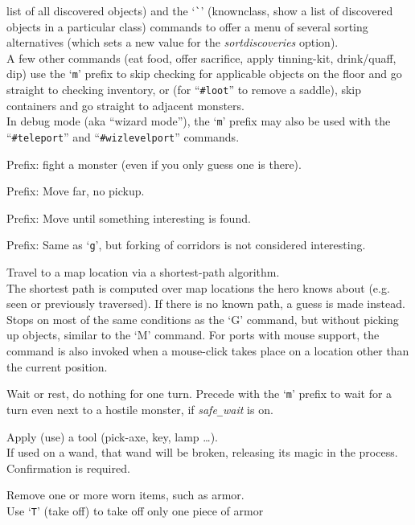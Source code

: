 list of all discovered objects) and the `{\tt \`{}}' (knownclass,
show a list of discovered objects in a particular class) commands to offer
a menu of several sorting alternatives (which sets a new value for the
{\it sortdiscoveries\/} option).
\\
A few other commands (eat food, offer sacrifice, apply tinning-kit,
drink/quaff, dip) use
the `{\tt m}' prefix to skip checking for applicable objects on
the floor and go straight to checking inventory,
or (for ``{\tt \#loot}'' to remove a saddle),
skip containers and go straight to adjacent monsters.
\\
In debug mode (aka ``wizard mode''), the `{\tt m}' prefix may also be
used with the ``{\tt \#teleport}'' and ``{\tt \#wizlevelport}'' commands.
\item[\tb{F[yuhjklbn]}]
Prefix:  fight a monster (even if you only guess one is there).
\item[\tb{M[yuhjklbn]}]
Prefix:  Move far, no pickup.
\item[\tb{g[yuhjklbn]}]
Prefix:  Move until something interesting is found.
\item[\tb{G[yuhjklbn] {\rm or} <CONTROL->[yuhjklbn]}]
Prefix:  Same as `{\tt g}', but forking of corridors is not considered
interesting.
\item[\tb{_}]
Travel to a map location via a shortest-path algorithm.\\
The shortest path
is computed over map locations the hero knows about (e.g. seen or
previously traversed).  If there is no known path, a guess is made instead.
Stops on most of
the same conditions as the `G' command, but without picking up
objects, similar to the `M' command.  For ports with mouse
support, the command is also invoked when a mouse-click takes place on a
location other than the current position.
\item[\tb{.}]
Wait or rest, do nothing for one turn. Precede with the `{\tt m}' prefix
to wait for a turn even next to a hostile monster, if {\it safe\verb+_+wait\/}
is on.
\item[\tb{a}]
Apply (use) a tool (pick-axe, key, lamp \ldots).\\
If used on a wand, that wand will be broken, releasing its magic in the
process.  Confirmation is required.
\item[\tb{A}]
Remove one or more worn items, such as armor.\\
Use `{\tt T}' (take off) to take off only one piece of armor
